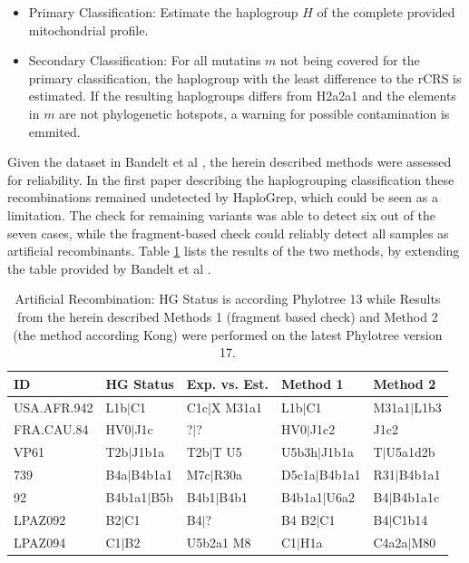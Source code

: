 \begin{itemize}
	\item Primary Classification: Estimate the haplogroup $H$ of the complete provided mitochondrial profile. 
		\item Secondary Classification: For all mutatins $m$ not being covered for the primary classification, the haplogroup with the least difference to the rCRS is estimated. If the resulting haplogroups differs from H2a2a1 and the elements in $m$ are not phylogenetic hotspots, a warning for possible contamination is emmited.
\end{itemize}

Given the dataset in Bandelt et al \cite{Bandelt2012}, the herein described methods were assessed for reliability. In the first paper describing the haplogrouping classification these recombinations remained undetected by HaploGrep, which could be seen as a limitation. The check for remaining variants was able to detect six out of the seven cases, while the fragment-based check could reliably detect all samples as artificial recombinants. Table \ref{table:recomb} lists the results of the two methods, by extending the table provided by Bandelt et al \cite{Bandelt2012}. 


\begin{table}[H]
\centering

\begin{tabular}{lllll}
ID & HG Status & Exp. vs. Est. & Method 1 & Method 2\\ \midrule
USA.AFR.942 & L1b$|$C1 & C1c$|$X M31a1 & L1b$|$C1 &  M31a1$|$L1b3 \\
FRA.CAU.84 & HV0$|$J1c & ?$|$? & HV0$|$J1c2 & J1c2 \\
VP61 & T2b$|$J1b1a & T2b$|$T U5 & U5b3h$|$J1b1a & T$|$U5a1d2b \\
739 & B4a$|$B4b1a1 & M7c$|$R30a & D5c1a$|$B4b1a1 & R31$|$B4b1a1 \\
92 & B4b1a1$|$B5b & B4b1$|$B4b1& B4b1a1$|$U6a2 & B4$|$B4b1a1c \\
LPAZ092 & B2$|$C1 & B4$|$?& B4 B2$|$C1 & B4$|$C1b14 \\
LPAZ094 & C1$|$B2&U5b2a1 M8& C1$|$H1a & C4a2a$|$M80 
\end{tabular}
\caption{Artificial Recombination: HG Status is according Phylotree 13 while Results from the herein described Methods 1 (fragment based check) and Method 2 (the method according Kong) were performed on the latest Phylotree version 17.}
\label{table:recomb}
\end{table}

